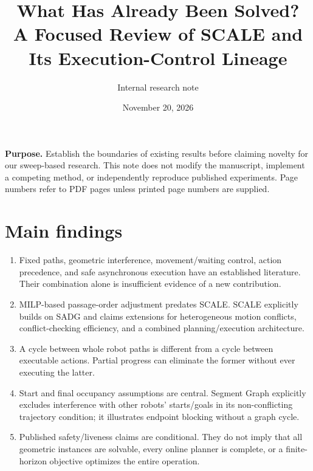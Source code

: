 \documentclass[11pt,a4paper]{article}
\title{What Has Already Been Solved?\\A Focused Review of SCALE and Its Execution-Control Lineage}
\author{Internal research note}
\date{November 20, 2026}
\begin{document}
\maketitle
\noindent\textbf{Purpose.} Establish the boundaries of existing results before claiming
novelty for our sweep-based research. This note does not modify the manuscript,
implement a competing method, or independently reproduce published experiments.
Page numbers refer to PDF pages unless printed page numbers are supplied.

\section{Main findings}
\begin{enumerate}
\item Fixed paths, geometric interference, movement/waiting control, action
precedence, and safe asynchronous execution have an established literature.
Their combination alone is insufficient evidence of a new contribution.
\item MILP-based passage-order adjustment predates SCALE. SCALE explicitly
builds on SADG and claims extensions for heterogeneous motion conflicts,
conflict-checking efficiency, and a combined planning/execution architecture.
\item A cycle between whole robot paths is different from a cycle between
executable actions. Partial progress can eliminate the former without ever
executing the latter.
\item Start and final occupancy assumptions are central. Segment Graph explicitly
excludes interference with other robots' starts/goals in its non-conflicting
trajectory condition; it illustrates endpoint blocking without a graph cycle.
\item Published safety/liveness claims are conditional. They do not imply that
all geometric instances are solvable, every online planner is complete, or a
finite-horizon objective optimizes the entire operation.
\end{enumerate}
\end{document}
